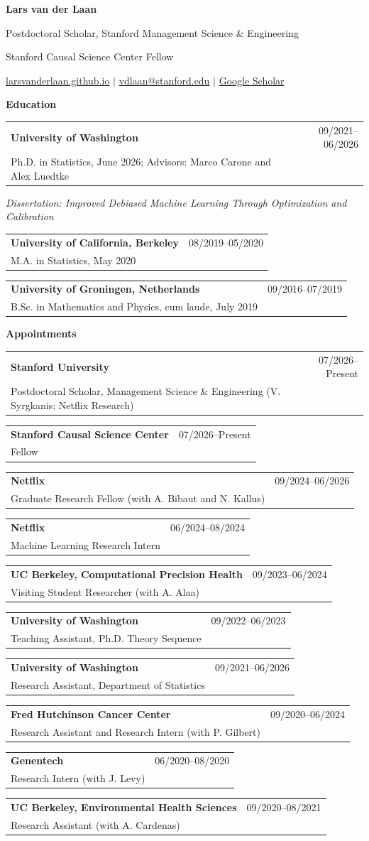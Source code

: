 \documentclass[10pt,letterpaper]{article}
\makeatletter
\newcommand{\cvsection}[1]{%
  \vspace{0.55em}%
  {\Large\bfseries #1}\par
  \vspace{0.20em}%
}
\newcommand{\cventry}[3]{%
  \begin{tabularx}{\textwidth}{@{}Xr@{}}
    \textbf{#1} & #3 \\
    #2 & \\
  \end{tabularx}\par
}
\makeatother
\begin{document}
\begin{center}
  {\fontsize{22}{25}\selectfont\bfseries Lars van der Laan}\par
  \vspace{0.20em}
  {\large Postdoctoral Scholar, Stanford Management Science \& Engineering}\par
  {\large Stanford Causal Science Center Fellow}\par
  \vspace{0.25em}
  \href{https://larsvanderlaan.github.io}{larsvanderlaan.github.io}
  \quad $\vert$ \quad
  \href{mailto:vdlaan@stanford.edu}{vdlaan@stanford.edu}
  \quad $\vert$ \quad
  \href{https://scholar.google.com/citations?user=0bwP0i4AAAAJ}{Google Scholar}
\end{center}

\cvsection{Education}
\cventry{University of Washington}{Ph.D. in Statistics, June 2026; Advisors: Marco Carone and Alex Luedtke}{09/2021--06/2026}
\par\vspace{0.20em}
\noindent\emph{Dissertation: Improved Debiased Machine Learning Through Optimization and Calibration}\par
\vspace{0.25em}
\cventry{University of California, Berkeley}{M.A. in Statistics, May 2020}{08/2019--05/2020}
\vspace{0.25em}
\cventry{University of Groningen, Netherlands}{B.Sc. in Mathematics and Physics, cum laude, July 2019}{09/2016--07/2019}

\cvsection{Appointments}
\cventry{Stanford University}{Postdoctoral Scholar, Management Science \& Engineering (V. Syrgkanis; Netflix Research)}{07/2026--Present}
\vspace{0.20em}
\cventry{Stanford Causal Science Center}{Fellow}{07/2026--Present}
\vspace{0.20em}
\cventry{Netflix}{Graduate Research Fellow (with A. Bibaut and N. Kallus)}{09/2024--06/2026}
\vspace{0.20em}
\cventry{Netflix}{Machine Learning Research Intern}{06/2024--08/2024}
\vspace{0.20em}
\cventry{UC Berkeley, Computational Precision Health}{Visiting Student Researcher (with A. Alaa)}{09/2023--06/2024}
\vspace{0.20em}
\cventry{University of Washington}{Teaching Assistant, Ph.D. Theory Sequence}{09/2022--06/2023}
\vspace{0.20em}
\cventry{University of Washington}{Research Assistant, Department of Statistics}{09/2021--06/2026}
\vspace{0.20em}
\cventry{Fred Hutchinson Cancer Center}{Research Assistant and Research Intern (with P. Gilbert)}{09/2020--06/2024}
\vspace{0.20em}
\cventry{Genentech}{Research Intern (with J. Levy)}{06/2020--08/2020}
\vspace{0.20em}
\cventry{UC Berkeley, Environmental Health Sciences}{Research Assistant (with A. Cardenas)}{09/2020--08/2021}
\end{document}
